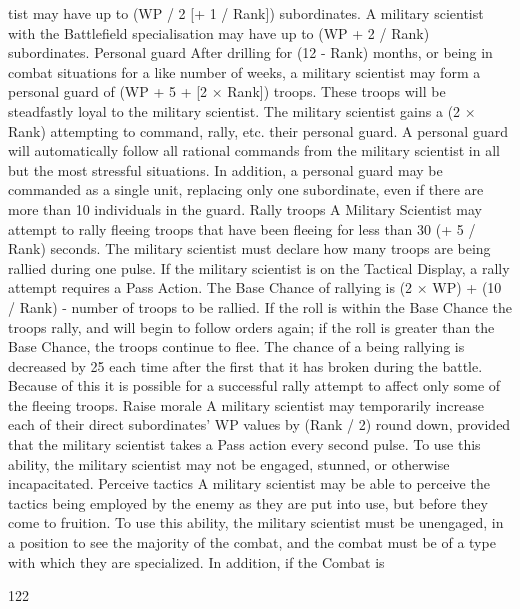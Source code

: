 \documentclass[a4paper]{article}
\begin{document}
\begin{multicols}{3}
tist may have up to (WP / 2 [+ 1 / Rank]) subordinates. A military scientist with the Battlefield
specialisation may have up to (WP + 2 / Rank)
subordinates.
Personal guard
After drilling for (12 - Rank) months, or being in
combat situations for a like number of weeks, a
military scientist may form a personal guard of
(WP + 5 + [2 × Rank]) troops. These troops will be
steadfastly loyal to the military scientist. The military scientist gains a (2 × Rank)%
attempting to command, rally, etc. their personal
guard. A personal guard will automatically follow
all rational commands from the military scientist in
all but the most stressful situations. In addition, a
personal guard may be commanded as a single
unit, replacing only one subordinate, even if there
are more than 10 individuals in the guard.
Rally troops
A Military Scientist may attempt to rally fleeing
troops that have been fleeing for less than 30 (+ 5 /
Rank) seconds. The military scientist must declare
how many troops are being rallied during one
pulse. If the military scientist is on the Tactical
Display, a rally attempt requires a Pass Action. The
Base Chance of rallying is (2 × WP) + (10 / Rank)
- number of troops to be rallied. If the roll is within
the Base Chance the troops rally, and will begin to
follow orders again; if the roll is greater than the
Base Chance, the troops continue to flee. The
chance of a being rallying is decreased by 25%
each time after the first that it has broken during
the battle. Because of this it is possible for a successful rally attempt to affect only some of the
fleeing troops.
Raise morale
A military scientist may temporarily increase each
of their direct subordinates’ WP values by (Rank /
2) round down, provided that the military scientist
takes a Pass action every second pulse. To use this
ability, the military scientist may not be engaged,
stunned, or otherwise incapacitated.
Perceive tactics
A military scientist may be able to perceive the
tactics being employed by the enemy as they are
put into use, but before they come to fruition. To
use this ability, the military scientist must be unengaged, in a position to see the majority of the combat, and the combat must be of a type with which
they are specialized. In addition, if the Combat is

122


\end{multicols}
\end{document}
